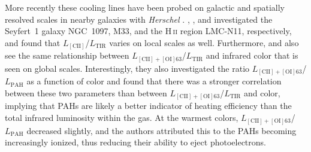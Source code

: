 More recently these cooling lines have been probed on galactic and spatially resolved scales in nearby galaxies with \emph{Herschel} \citep[e.g., ][]{2010A&A...518L..60B, 2012ApJ...751..144B, 2011ApJ...728L...7G, 2011A&A...532A.152M, 2012ApJ...747...81C, 2012A&A...544A..55B, 2012A&A...548A..91L, 2013A&A...549A.118C}.  \citet{2010A&A...518L..60B,2012ApJ...751..144B}, \citet{2011A&A...532A.152M}, and \citet{2012A&A...548A..91L} investigated the Seyfert~1 galaxy NGC~1097, M33, and the H\,\textsc{ii} region LMC-N11, respectively, and found that $L_{\mathrm{[CII]}}$/$L_{\mathrm{TIR}}$ varies on local scales as well.  Furthermore, \citet{2012ApJ...747...81C} and \citet{2012A&A...548A..91L} also see the same relationship between $L_{\mathrm{[CII]+[OI]63}}$/$L_{\mathrm{TIR}}$ and infrared color that is seen on global scales.  Interestingly, they also investigated the ratio $L_{\mathrm{[CII]+[OI]63}}$/$L_{\mathrm{PAH}}$ as a function of color and found that there was a stronger correlation between these two parameters than between $L_{\mathrm{[CII]+[OI]63}}$/$L_{\mathrm{TIR}}$ and color, implying that PAHs are likely a better indicator of heating efficiency than the total infrared luminosity within the gas.  At the warmest colors, $L_{\mathrm{[CII]+[OI]63}}$/$L_{\mathrm{PAH}}$ decreased slightly, and the authors attributed this to the PAHs becoming increasingly ionized, thus reducing their ability to eject photoelectrons.


